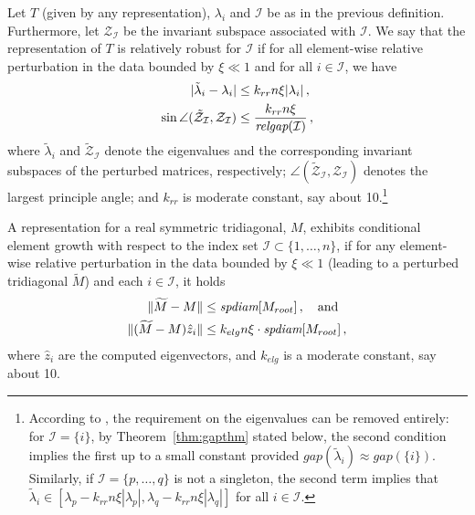 \documentclass[final]{siamltex}
\newcommand\norm[1]{\lVert#1\rVert}
\begin{document}
\begin{definition} 
Let $T$ (given by any representation), $\lambda_i$ and $\mathcal{I}$ be as
in the previous definition. Furthermore, let $\mathcal{Z}_{\mathcal{I}}$ be
the invariant subspace associated with $\mathcal{I}$. We say 
  that the representation of $T$ is relatively robust for $\mathcal{I}$
  if for all element-wise relative perturbation in the data bounded by
  $\xi \ll 1$ and for all $i \in \mathcal{I}$, we have 
  \begin{align*}
    |\tilde{\lambda}_i - \lambda_i| &\leq k_{rr} n \xi |\lambda_i| \,,  \\
    \sin \angle (\tilde{\mathcal{Z}}_{\mathcal{I}},\mathcal{Z}_{\mathcal{I}}) &\leq \frac{k_{rr} n \xi}{\mbox{\em relgap}(\mathcal{I})} \,,
  \end{align*}
where $\tilde{\lambda}_i$ and $\tilde{\mathcal{Z}}_{\mathcal{I}}$ denote the
eigenvalues and the corresponding invariant subspaces of the perturbed matrices,
respectively; $\angle(\tilde{\mathcal{Z}}_{\mathcal{I}},\mathcal{Z}_{\mathcal{I}})$
denotes the largest principle angle; 
and $k_{rr}$ is moderate constant, say about 10.\footnote{According to
  \cite{Willems:Diss,Willems:framework}, the requirement on the eigenvalues
  can be removed entirely: for $\mathcal{I}=\{i\}$, by
  Theorem~\ref{thm:gapthm} stated below, the second condition implies 
  the first up to a small constant provided $gap(\tilde{\lambda}_i) \approx
  gap(\{i\})$.  Similarly, if $\mathcal{I} = \{p,\ldots,q\}$ is not a
  singleton, the second term implies that $\tilde{\lambda}_i \in [\lambda_p
  - k_{rr} n \xi |\lambda_p|, \lambda_q - k_{rr} n \xi |\lambda_q|]$ for all $i \in \mathcal{I}$. 
}
\label{def:RRR}
\end{definition}

\begin{definition} 
A representation for a real symmetric tridiagonal, $M$, exhibits conditional
element growth with respect to the index set $\mathcal{I} \subset \{1,\ldots,n\}$,
if for any element-wise relative perturbation in the data
bounded by $\xi \ll 1$ (leading to a perturbed tridiagonal $\widetilde{M}$) and each $i \in 
\mathcal{I}$, it holds
\begin{align*}
  \norm{\widetilde{M} - M} &\leq \mbox{\em spdiam}[M_{root}] \,, \quad
  \mbox{and} \\ \norm{(\widetilde{M} - M) \hat{z}_i} &\leq k_{elg} n \xi \cdot \mbox{\em spdiam}[M_{root}]
  \,, \end{align*}
where $\hat{z}_i$ are the computed eigenvectors, and $k_{elg}$ is a moderate
constant, say about 10. 
\end{definition}
\end{document}
